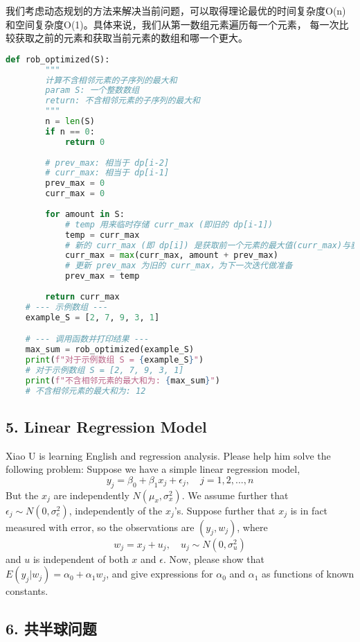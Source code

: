 \documentclass[UTF8]{ctexart}
\begin{document}
我们考虑动态规划的方法来解决当前问题，可以取得理论最优的时间复杂度O(n)和空间复杂度O(1)。具体来说，我们从第一数组元素遍历每一个元素，
每一次比较获取之前的元素和获取当前元素的数组和哪一个更大。
\begin{lstlisting}[language=Python, caption=O(1) 空间复杂度的解法]
    def rob_optimized(S):
        """
        计算不含相邻元素的子序列的最大和
        param S: 一个整数数组
        return: 不含相邻元素的子序列的最大和
        """
        n = len(S)
        if n == 0:
            return 0
        
        # prev_max: 相当于 dp[i-2]
        # curr_max: 相当于 dp[i-1]
        prev_max = 0
        curr_max = 0
    
        for amount in S:
            # temp 用来临时存储 curr_max (即旧的 dp[i-1])
            temp = curr_max
            # 新的 curr_max (即 dp[i]) 是获取前一个元素的最大值(curr_max)与获得当前元素(amount + prev_max)的较大值
            curr_max = max(curr_max, amount + prev_max)
            # 更新 prev_max 为旧的 curr_max，为下一次迭代做准备
            prev_max = temp
    
        return curr_max
    # --- 示例数组 ---
    example_S = [2, 7, 9, 3, 1]

    # --- 调用函数并打印结果 ---
    max_sum = rob_optimized(example_S)
    print(f"对于示例数组 S = {example_S}")
    # 对于示例数组 S = [2, 7, 9, 3, 1]
    print(f"不含相邻元素的最大和为: {max_sum}") 
    # 不含相邻元素的最大和为: 12
\end{lstlisting}

\subsection*{5. Linear Regression Model}
Xiao U is learning English and regression analysis. Please help him solve the following problem:
Suppose we have a simple linear regression model,
$$ y_{j}=\beta_{0}+\beta_{1}x_{j}+\epsilon_{j}, \quad j=1,2,...,n $$
But the $x_{j}$ are independently $N(\mu_{x},\sigma_{x}^{2})$. We assume further that $\epsilon_{j}\sim N(0,\sigma_{e}^{2})$, independently of the $x_{j}$'s.
Suppose further that $x_{j}$ is in fact measured with error, so the observations are $(y_{j},w_{j})$, where
$$ w_{j}=x_{j}+u_{j}, \quad u_{j}\sim N(0,\sigma_{u}^{2}) $$
and $u$ is independent of both $x$ and $\epsilon$.
Now, please show that $E(y_{j}|w_{j})=\alpha_{0}+\alpha_{1}w_{j}$, and give expressions for $\alpha_{0}$ and $\alpha_{1}$ as functions of known constants.

\subsection*{6. 共半球问题}
\end{document}
